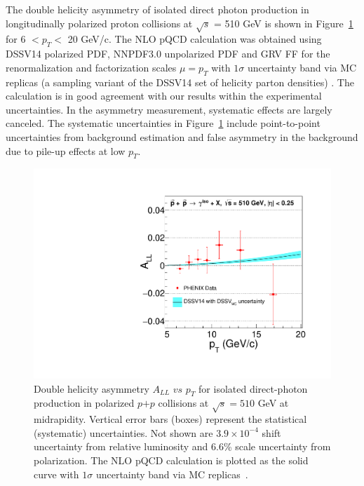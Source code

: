 \documentclass[twocolumn,letterpaper,aps,prl,longbibliography,superscriptaddress,floatfix]{revtex4-2}
\newcommand{\pT}{\ensuremath{p_T}}
\begin{document}
The double helicity asymmetry of isolated direct photon production in longitudinally polarized proton collisions at $\sqrt{s}$ = 510 GeV is shown in Figure~\ref{fig:all} for 6 $< p_{T} <$ 20 GeV/c. The NLO pQCD calculation was obtained using DSSV14 polarized PDF, NNPDF3.0 unpolarized PDF and GRV FF for the renormalization and factorization scales $\mu = p_T$ with $1\sigma$ uncertainty band via MC replicas (a sampling variant of the DSSV14 set of helicity parton densities) \cite{PhysRevLett.101.072001, PhysRevLett.113.012001, PhysRevD.100.114027}. The calculation is in good agreement with our results within the experimental uncertainties. In the asymmetry measurement, systematic effects are largely canceled. The systematic uncertainties in Figure~\ref{fig:all} include point-to-point uncertainties from background estimation and false asymmetry in the background due to pile-up effects at low \pT.

\begin{figure}[htb]
\includegraphics[width=1.0\linewidth]{IsoPhotonALL-beam2.pdf}
\caption{Double helicity asymmetry $A_{LL}$ $vs$ $p_{T}$ for isolated direct-photon production in polarized $p$$+$$p$ collisions at $\sqrt{s}=510$ GeV at midrapidity. Vertical error bars (boxes) represent the statistical (systematic) uncertainties. Not shown are $3.9 \times 10^{-4}$ shift uncertainty from relative luminosity and 6.6\% scale uncertainty from polarization. The NLO pQCD calculation is plotted as the solid curve with $1\sigma$ uncertainty band via MC replicas~\cite{PhysRevLett.101.072001,PhysRevLett.113.012001,PhysRevD.100.114027}.}
\label{fig:all}
\end{figure} 
\end{document}
